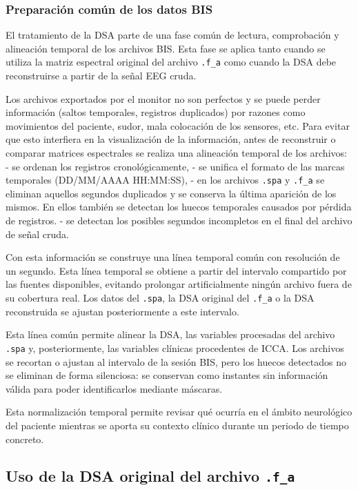 \documentclass[
  spanish,
  a4paper,
  12pt,
  twoside]{memoir}
\begin{document}
\subsubsection{Preparación común de los datos
BIS}\label{preparaciuxf3n-comuxfan-de-los-datos-bis}

El tratamiento de la DSA parte de una fase común de lectura,
comprobación y alineación temporal de los archivos BIS. Esta fase se
aplica tanto cuando se utiliza la matriz espectral original del archivo
\texttt{.f\_a} como cuando la DSA debe reconstruirse a partir de la
señal EEG cruda.

Los archivos exportados por el monitor no son perfectos y se puede
perder información (saltos temporales, registros duplicados) por razones
como movimientos del paciente, sudor, mala colocación de los sensores,
etc. Para evitar que esto interfiera en la visualización de la
información, antes de reconstruir o comparar matrices espectrales se
realiza una alineación temporal de los archivos: - se ordenan los
registros cronológicamente, - se unifica el formato de las marcas
temporales (DD/MM/AAAA HH:MM:SS), - en los archivos \texttt{.spa} y
\texttt{.f\_a} se eliminan aquellos segundos duplicados y se conserva la
última aparición de los mismos. En ellos también se detectan los huecos
temporales causados por pérdida de registros. - se detectan los posibles
segundos incompletos en el final del archivo de señal cruda.

Con esta información se construye una línea temporal común con
resolución de un segundo. Esta línea temporal se obtiene a partir del
intervalo compartido por las fuentes disponibles, evitando prolongar
artificialmente ningún archivo fuera de su cobertura real. Los datos del
\texttt{.spa}, la DSA original del \texttt{.f\_a} o la DSA reconstruida
se ajustan posteriormente a este intervalo.

Esta línea común permite alinear la DSA, las variables procesadas del
archivo \texttt{.spa} y, posteriormente, las variables clínicas
procedentes de ICCA. Los archivos se recortan o ajustan al intervalo de
la sesión BIS, pero los huecos detectados no se eliminan de forma
silenciosa: se conservan como instantes sin información válida para
poder identificarlos mediante máscaras.

Esta normalización temporal permite revisar qué ocurría en el ámbito
neurológico del paciente mientras se aporta su contexto clínico durante
un periodo de tiempo concreto.

\subsection{\texorpdfstring{Uso de la DSA original del archivo
\texttt{.f\_a}}{Uso de la DSA original del archivo .f\_a}}\label{uso-de-la-dsa-original-del-archivo-.f_a}
\end{document}
